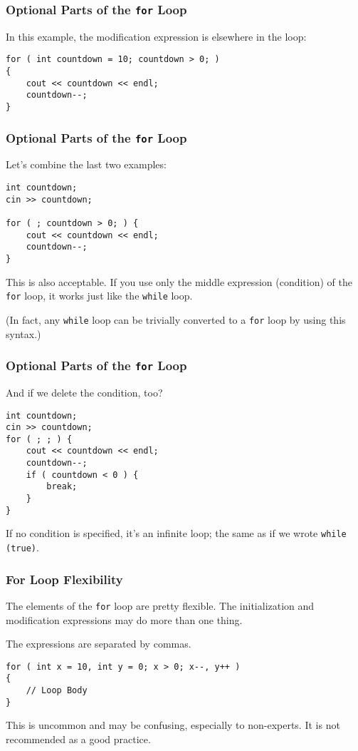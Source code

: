 \begin{frame}[fragile]
\frametitle{Optional Parts of the \texttt{for} Loop}

In this example, the modification expression is elsewhere in the loop:

\begin{verbatim}
for ( int countdown = 10; countdown > 0; )
{
    cout << countdown << endl;
    countdown--;
}
\end{verbatim}

\end{frame}

\begin{frame}[fragile]
\frametitle{Optional Parts of the \texttt{for} Loop}

Let's combine the last two examples:

\begin{verbatim}
int countdown; 
cin >> countdown;

for ( ; countdown > 0; ) {
    cout << countdown << endl;
    countdown--;
}
\end{verbatim}

This is also acceptable. If you use only the middle expression (condition) of the \texttt{for} loop, it works just like the \texttt{while} loop.

(In fact, any \texttt{while} loop can be trivially converted to a \texttt{for} loop by using this syntax.)

\end{frame}

\begin{frame}[fragile]
\frametitle{Optional Parts of the \texttt{for} Loop}

And if we delete the condition, too?

\begin{verbatim}
int countdown;
cin >> countdown;
for ( ; ; ) {
    cout << countdown << endl;
    countdown--;
    if ( countdown < 0 ) {
        break;
    }    
}
\end{verbatim}

If no condition is specified, it's an infinite loop; the same as if we wrote \texttt{while (true)}.

\end{frame}

\begin{frame}[fragile]
\frametitle{For Loop Flexibility}

The elements of the \texttt{for} loop are pretty flexible. The initialization and modification expressions may do more than one thing.

The expressions are separated by commas.

\begin{verbatim}
for ( int x = 10, int y = 0; x > 0; x--, y++ )
{
    // Loop Body
}
\end{verbatim}

This is uncommon and may be confusing, especially to non-experts. It is not recommended as a good practice.

\end{frame}

